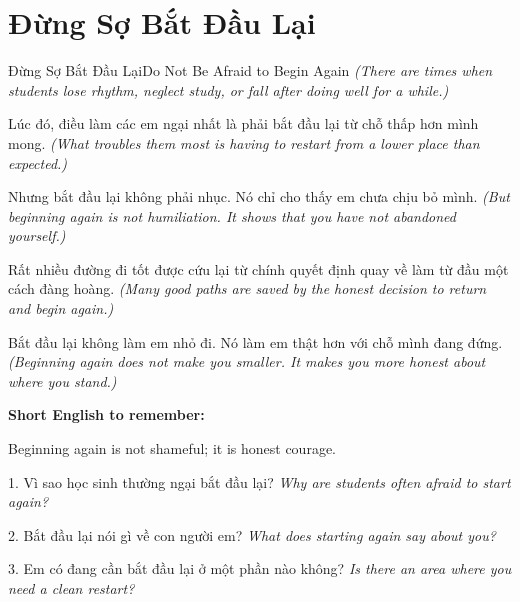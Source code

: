 \section{Đừng Sợ Bắt Đầu Lại}
\begin{truyen}{Đừng Sợ Bắt Đầu Lại}{Do Not Be Afraid to Begin Again}
\textit{(There are times when students lose rhythm, neglect study, or fall after doing well for a while.)}

Lúc đó, điều làm các em ngại nhất là phải bắt đầu lại từ chỗ thấp hơn mình mong.
\textit{(What troubles them most is having to restart from a lower place than expected.)}

Nhưng bắt đầu lại không phải nhục. Nó chỉ cho thấy em chưa chịu bỏ mình.
\textit{(But beginning again is not humiliation. It shows that you have not abandoned yourself.)}

Rất nhiều đường đi tốt được cứu lại từ chính quyết định quay về làm từ đầu một cách đàng hoàng.
\textit{(Many good paths are saved by the honest decision to return and begin again.)}
\end{truyen}

\begin{baihoc}
Bắt đầu lại không làm em nhỏ đi. Nó làm em thật hơn với chỗ mình đang đứng.
\textit{(Beginning again does not make you smaller. It makes you more honest about where you stand.)}
\end{baihoc}

\begin{ghinhoanh}
\textbf{Short English to remember:}

Beginning again is not shameful; it is honest courage.

\end{ghinhoanh}

\begin{tuhocnhanh}
1. Vì sao học sinh thường ngại bắt đầu lại? \textit{Why are students often afraid to start again?}

2. Bắt đầu lại nói gì về con người em? \textit{What does starting again say about you?}

3. Em có đang cần bắt đầu lại ở một phần nào không? \textit{Is there an area where you need a clean restart?}
\end{tuhocnhanh}
\ngancach

